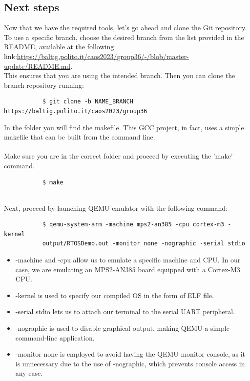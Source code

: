 \subsection{ Next steps }
Now that we have the required tools, let's go ahead and clone the Git repository.\\
To use a specific branch, choose the desired branch from the list provided in the README, available at the following link:\url{https://baltig.polito.it/caos2023/group36/-/blob/master-update/README.md}. \\This ensures that you are using  the intended branch. Then you can clone the branch repository running:
\begin{verbatim}
           $ git clone -b NAME_BRANCH https://baltig.polito.it/caos2023/group36

    \end{verbatim}
In the folder you will find the makefile. This GCC project, in fact, uses a simple makefile that can be built from the command line.
\\\\Make sure you are in the correct folder and proceed by executing the 'make' command.
\begin{verbatim}
           $ make
    \end{verbatim}

\leavevmode\\Next, proceed by launching QEMU emulator with the following command:
\begin{verbatim}
           $ qemu-system-arm -machine mps2-an385 -cpu cortex-m3 -kernel 
           output/RTOSDemo.out -monitor none -nographic -serial stdio
\end{verbatim}

\begin{itemize}
    \item -machine and -cpu allow us to emulate a specific machine and CPU. In our case, we are emulating an MPS2-AN385 board equipped with a Cortex-M3 CPU.
    \item -kernel is used to specify our compiled OS in the form of ELF file.
    \item -serial stdio lets us to attach our terminal to the serial UART peripheral.
    \item -nographic is used to disable graphical output, making QEMU a simple command-line application.
    \item -monitor none is employed to avoid having the QEMU monitor console, as it is unnecessary due to the use of -nographic, which prevents console access in any case.
\end{itemize}

